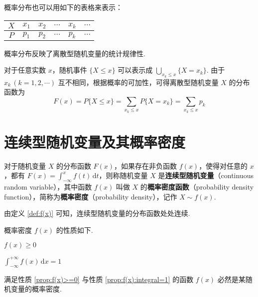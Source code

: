 概率分布也可以用如下的表格来表示：
\begin{table*}[htbp]
    \centering

    \begin{tabular}{c | c c c c c}
        \hline
        $X$ & $x_1$ & $x_2$ & $\cdots$ & $x_k$ & $\cdots$ \\
        \hline
        $P$ & $p_1$ & $p_2$ & $\cdots$ & $p_k$ & $\cdots$ \\
        \hline
    \end{tabular}
\end{table*}

概率分布反映了离散型随机变量的统计规律性.

对于任意实数 $x$，随机事件 $\{X \leqslant x\}$ 可以表示成 $\displaystyle\bigcup_{x_k \leqslant x} \{X=x_k\}$. 由于 $x_k\, (k=1,2,\cdots)$ 互不相同，根据概率的可加性，可得离散型随机变量 $X$ 的分布函数为
$$
F(x) = P\{X \leqslant x\} = \sum_{x_k \leqslant x} P\{X=x_k\} = \sum_{x_k \leqslant x} p_k
$$

\section{连续型随机变量及其概率密度}

\begin{definition} \label{def:f(x)}
    对于随机变量 $X$ 的分布函数 $F(x)$，如果存在非负函数 $f(x)$，使得对任意的 $x$，都有 $F(x)=\displaystyle\int_{-\infty}^x f(t)\,\text{d}t$，则称随机变量 $X$ 是\textbf{连续型随机变量}（continuous random variable），其中函数 $f(x)$ 叫做 $X$ 的\textbf{概率密度函数}（probability density function），简称为\textbf{概率密度}（probability density），记作 $X \sim f(x)$.
\end{definition}

由定义 \ref{def:f(x)} 可知，连续型随机变量的分布函数处处连续.

概率密度 $f(x)$ 的性质如下.

\setcounter{propertyname}{0}

\begin{property} \label{prop:f(x)>=0}
    $f(x) \geqslant 0$
\end{property}

\begin{property} \label{prop:f(x):integral=1}
    $\displaystyle\int_{-\infty}^{+\infty} f(x)\,\text{d}x = 1$
\end{property}

满足性质 \ref*{prop:f(x)>=0} 与性质 \ref*{prop:f(x):integral=1} 的函数 $f(x)$ 必然是某随机变量的概率密度.


